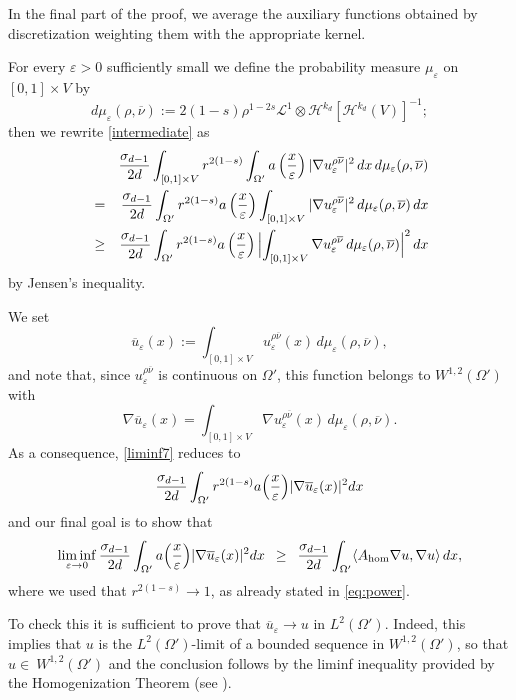 \documentclass[11pt,a4paper,reqno]{amsart}
\theoremstyle{plain}
\theoremstyle{definition}
\newcommand\e{\varepsilon}
\theoremstyle{remark}
\begin{document}
\smallskip

In the final part of the proof, we average the auxiliary functions obtained by discretization weighting them with the appropriate kernel. 

For every $\e>0$ sufficiently small we define the probability measure $\mu_\e$ on $[0,1] \times V$ by
\[
d\mu_\e(\rho, \overline{\nu}):= 2(1-s)\rho^{1-2s}\mathcal{L}^1 \otimes \mathcal{H}^{k_d} [\mathcal{H}^{k_d}(V)]^{-1}  ;
\]
then we rewrite \eqref{intermediate} as
\begin{eqnarray}\label{disega}\nonumber&&
\hskip-3cm \frac{\sigma_{d-1}}{2d} \int_{[0,1]\times V} r^{2(1-s)} \int_{\Omega'} a\left(\frac{x}{\e}\right)   |\nabla u_\e^{\rho\overline{\nu}}|^2\,dx\,d\mu_\e(\rho,\overline{\nu}) 
\\ \nonumber
&=& \frac{\sigma_{d-1}}{2d} \int_{\Omega'} r^{2(1-s)} a\left(\frac{x}{\e}\right) \int_{[0,1]\times V}   |\nabla u_\e^{\rho\overline{\nu}}|^2\,   d\mu_\e(\rho,\overline{\nu})\,dx \\ \label{liminf7}
&\geq& \frac{\sigma_{d-1}}{2d} \int_{\Omega'} r^{2(1-s)} a\left(\frac{x}{\e}\right) \Bigl|\int_{[0,1]\times V}  \nabla u_\e^{\rho\overline{\nu}}\,   d\mu_\e(\rho, \overline{\nu})\Bigr|^2\,dx
\end{eqnarray}
by Jensen's inequality.

We set 
$$
\overline u_\e(x):=\int_{[0,1]\times V}u^{\rho\overline{\nu}}_\e(x)\, d\mu_\e(\rho, \overline{\nu}),
$$
and note that, since $u_\e^{\rho\overline{\nu}}$ is continuous on $\Omega'$, this function belongs to $W^{1,2}(\Omega')$ with
\[
\nabla \overline u_\e(x)=\int_{[0,1]\times V}\nabla u^{\rho\overline{\nu}}_\e(x)\, d\mu_\e(\rho, \overline{\nu}).
\]
As a consequence, \eqref{liminf7} reduces to  
$$
\frac{\sigma_{d-1}}{ 2d}\int_{\Omega'} r^{2(1-s)} a\Bigl(\frac{x}{\e}\Bigr) |\nabla  \overline u_\e(x)|^2dx
$$
and our final goal is to show that
\begin{equation*}
    \liminf_{\e\to0} \frac{\sigma_{d-1}}{2d}\int_{\Omega'} a\Bigl(\frac{x}{\e}\Bigr) |\nabla  \overline u_\e(x)|^2dx \,\,\, \geq \,\,\, \frac{\sigma_{d-1}}{2d}\int_{\Omega'} \langle A_{\rm hom}\nabla  u,\nabla u\rangle\,dx,
\end{equation*}
where we used that $r^{2(1-s)}\to1$, as already stated in \eqref{eq:power}. 


To check this it is sufficient to prove that $\overline{u}_\e \to u$ in $L^2(\Omega')$.
Indeed, this implies that $u$ is the $L^2(\Omega')$-limit of a bounded sequence in $W^{1,2}(\Omega')$, so that $u\in\ W^{1,2}(\Omega')$ and the conclusion follows by the liminf inequality provided by the Homogenization Theorem (see \cite[Theorem 14.7]{BDF}). 
\end{document}
